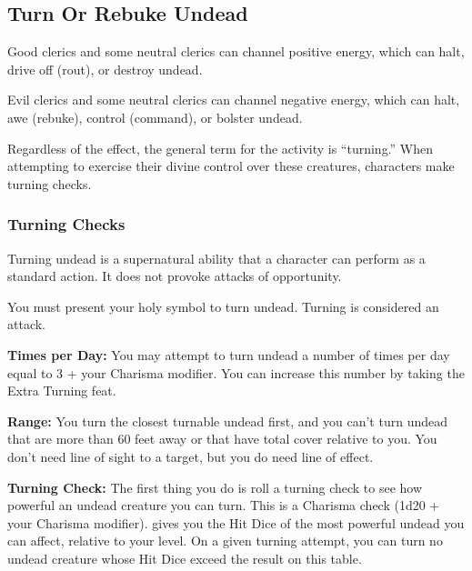 \subsection{Turn Or Rebuke Undead}
Good clerics and some neutral clerics can channel positive energy, which can halt, drive off (rout), or destroy undead.

Evil clerics and some neutral clerics can channel negative energy, which can halt, awe (rebuke), control (command), or bolster undead.

Regardless of the effect, the general term for the activity is ``turning.'' When attempting to exercise their divine control over these creatures, characters make turning checks.


\subsubsection{Turning Checks}
Turning undead is a supernatural ability that a character can perform as a standard action. It does not provoke attacks of opportunity.

You must present your holy symbol to turn undead. Turning is considered an attack.

\textbf{Times per Day:} You may attempt to turn undead a number of times per day equal to 3 + your Charisma modifier. You can increase this number by taking the Extra Turning feat.

\textbf{Range:} You turn the closest turnable undead first, and you can't turn undead that are more than 60 feet away or that have total cover relative to you. You don't need line of sight to a target, but you do need line of effect.

\textbf{Turning Check:} The first thing you do is roll a turning check to see how powerful an undead creature you can turn. This is a Charisma check (1d20 + your Charisma modifier).  gives you the Hit Dice of the most powerful undead you can affect, relative to your level. On a given turning attempt, you can turn no undead creature whose Hit Dice exceed the result on this table.


